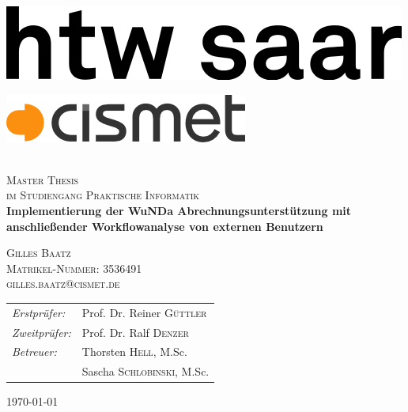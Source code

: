 \begin{titlepage}
\begin{center}

\begin{minipage}[t]{0.4\textwidth}
	\begin{flushleft}
	\includegraphics[width=\textwidth]{preamble/img/logo_htw_saar}
	\end{flushleft}
\end{minipage}
\hfill
\begin{minipage}[t]{0.4\textwidth}
	\begin{flushright}
	\includegraphics[width=\textwidth]{preamble/img/logo_cismet_grey}
	\end{flushright}
\end{minipage}



~\\[1cm]

\textsc{\LARGE Master Thesis}\\
\textsc{\large im Studiengang Praktische Informatik}\\[1.5cm]
\hspace{0.4cm}
{ \Large \bfseries  Implementierung der WuNDa Abrechnungsunterstützung mit anschließender Workflowanalyse von externen Benutzern \\[0.4cm] }

\hspace{1.5cm}

\textsc{\large Gilles Baatz}\\[0.2cm]
\textsc{\large Matrikel-Nummer: 3536491}\\[0.2cm]
\textsc{\large gilles.baatz@cismet.de}\\[4cm]

\begin{tabular}[0.8\textwidth]{l l}
\emph{Erstprüfer:} & Prof. Dr. Reiner \textsc{Güttler} \\
\emph{Zweitprüfer:} & Prof. Dr. Ralf \textsc{Denzer} \\
\emph{Betreuer:} & Thorsten \textsc{Hell}, M.Sc. \\
 				& Sascha \textsc{Schlobinski}, M.Sc.
\end{tabular}


\vfill

{\large \today}

\end{center}
\end{titlepage}